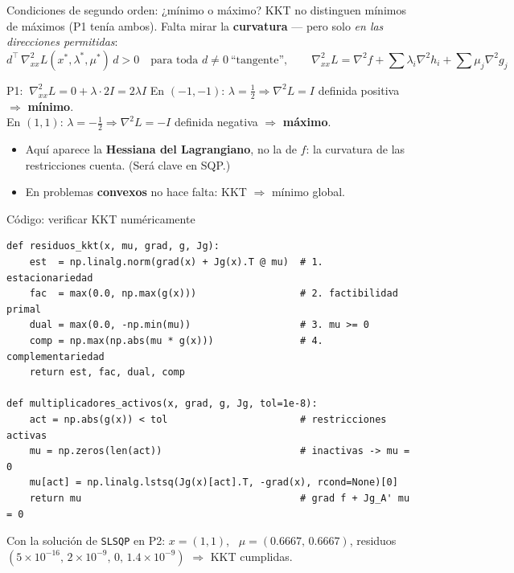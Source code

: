 \documentclass[aspectratio=169]{beamer}
\newcommand{\grad}{\nabla}
\newcommand{\xs}{x^\ast}
\begin{document}
\begin{frame}{Condiciones de segundo orden: ¿mínimo o máximo?}
  KKT no distinguen mínimos de máximos (P1 tenía ambos). Falta mirar la \textbf{curvatura} --- pero solo \emph{en las direcciones permitidas}:
  \[ d^\top\,\grad^2_{xx}L(\xs,\lambda^\ast,\mu^\ast)\,d>0\quad\text{para toda } d\neq0\ \text{``tangente''},\qquad \grad^2_{xx}L=\grad^2 f+\sum\lambda_i\grad^2h_i+\sum\mu_j\grad^2g_j \]
  \begin{exampleblock}{P1: $\ \grad^2_{xx}L=0+\lambda\cdot 2I=2\lambda I$}
    En $(-1,-1)$: $\lambda=\tfrac12\Rightarrow\grad^2L=I$ definida positiva $\Rightarrow$ \textbf{mínimo}.\\
    En $(1,1)$: $\lambda=-\tfrac12\Rightarrow\grad^2L=-I$ definida negativa $\Rightarrow$ \textbf{máximo}.
  \end{exampleblock}
  \begin{itemize}
    \item Aquí aparece la \textbf{Hessiana del Lagrangiano}, no la de $f$: la curvatura de las restricciones cuenta. (Será clave en SQP.)
    \item En problemas \textbf{convexos} no hace falta: KKT $\Rightarrow$ mínimo global.
  \end{itemize}
\end{frame}

\begin{frame}[fragile]{Código: verificar KKT numéricamente}
\begin{lstlisting}
def residuos_kkt(x, mu, grad, g, Jg):
    est  = np.linalg.norm(grad(x) + Jg(x).T @ mu)  # 1. estacionariedad
    fac  = max(0.0, np.max(g(x)))                  # 2. factibilidad primal
    dual = max(0.0, -np.min(mu))                   # 3. mu >= 0
    comp = np.max(np.abs(mu * g(x)))               # 4. complementariedad
    return est, fac, dual, comp

def multiplicadores_activos(x, grad, g, Jg, tol=1e-8):
    act = np.abs(g(x)) < tol                       # restricciones activas
    mu = np.zeros(len(act))                        # inactivas -> mu = 0
    mu[act] = np.linalg.lstsq(Jg(x)[act].T, -grad(x), rcond=None)[0]
    return mu                                      # grad f + Jg_A' mu = 0
\end{lstlisting}
  \small
  Con la solución de \texttt{SLSQP} en P2: $x=(1,1)$, \ $\mu=(0.6667,\,0.6667)$, residuos $(5\!\times\!10^{-16},\,2\!\times\!10^{-9},\,0,\,1.4\!\times\!10^{-9})$ $\Rightarrow$ KKT cumplidas.
\end{frame}
\end{document}
